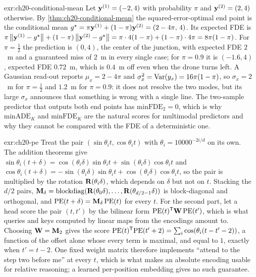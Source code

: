 \begin{solution}{exr:ch20-conditional-mean}
Let $\mathbf{y}^{(1)} = (-2, 4)$ with probability $\pi$ and $\mathbf{y}^{(2)} = (2, 4)$ otherwise. By \cref{thm:ch20-conditional-mean} the squared-error-optimal end point is the conditional mean $g^\star = \pi\mathbf{y}^{(1)} + (1 - \pi)\mathbf{y}^{(2)} = (2 - 4\pi,\, 4)$. Its expected FDE is $\pi\left\lVert \mathbf{y}^{(1)} - g^\star \right\rVert + (1 - \pi)\left\lVert \mathbf{y}^{(2)} - g^\star \right\rVert = \pi \cdot 4(1 - \pi) + (1 - \pi) \cdot 4\pi = 8\pi(1 - \pi)$. For $\pi = \tfrac12$ the prediction is $(0, 4)$, the center of the junction, with expected FDE $2$~m and a guaranteed miss of $2$~m in every single case; for $\pi = 0.9$ it is $(-1.6, 4)$, expected FDE $0.72$~m, which is $0.4$~m off even when the drone turns left. A Gaussian read-out reports $\mu_x = 2 - 4\pi$ and $\sigma_x^2 = \operatorname{Var}(y_x) = 16\pi(1 - \pi)$, so $\sigma_x = 2$~m for $\pi = \tfrac12$ and $1.2$~m for $\pi = 0.9$: it does not resolve the two modes, but its large $\sigma_x$ announces that something is wrong with a single line. The two-sample predictor that outputs both end points has $\mathrm{minFDE}_2 = 0$, which is why $\mathrm{minADE}_K$ and $\mathrm{minFDE}_K$ are the natural scores for multimodal predictors and why they cannot be compared with the FDE of a deterministic one.
\end{solution}

\begin{solution}{exr:ch20-pe}
Treat the pair $(\sin\theta_i t, \cos\theta_i t)$ with $\theta_i = 10000^{-2i/d}$ on its own. The addition theorems give $\sin\theta_i(t + \delta) = \cos(\theta_i\delta)\sin\theta_i t + \sin(\theta_i\delta)\cos\theta_i t$ and $\cos\theta_i(t + \delta) = -\sin(\theta_i\delta)\sin\theta_i t + \cos(\theta_i\delta)\cos\theta_i t$, so the pair is multiplied by the rotation $\mathbf{R}(\theta_i\delta)$, which depends on $\delta$ but not on $t$. Stacking the $d/2$ pairs, $\mathbf{M}_\delta = \operatorname{blockdiag}(\mathbf{R}(\theta_0\delta), \dots, \mathbf{R}(\theta_{d/2-1}\delta))$ is block-diagonal and orthogonal, and $\mathrm{PE}(t + \delta) = \mathbf{M}_\delta\,\mathrm{PE}(t)$ for every $t$. For the second part, let a head score the pair $(t, t')$ by the bilinear form $\mathrm{PE}(t)^{\mathsf{T}}\mathbf{W}\,\mathrm{PE}(t')$, which is what queries and keys computed by linear maps from the encodings amount to. Choosing $\mathbf{W} = \mathbf{M}_{2}$ gives the score $\mathrm{PE}(t)^{\mathsf{T}}\mathrm{PE}(t' + 2) = \sum_i \cos(\theta_i(t - t' - 2))$, a function of the offset alone whose every term is maximal, and equal to $1$, exactly when $t' = t - 2$. One fixed weight matrix therefore implements ``attend to the step two before me'' at every $t$, which is what makes an absolute encoding usable for relative reasoning; a learned per-position embedding gives no such guarantee.
\end{solution}

